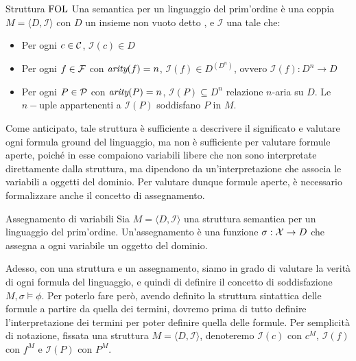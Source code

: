 \begin{definition}{Struttura \(\FOL\)}
  Una  semantica per un linguaggio del prim'ordine è una coppia \(M = \langle D, \mathcal{I} \rangle\) con \(D\) un insieme non vuoto detto , e \(\mathcal{I}\) una  tale che:
  \begin{itemize}
    \item Per ogni \(c\in\mathcal{C}\), \(\mathcal{I}(c)\in D\)
    \item Per ogni \(f\in\mathcal{F}\) con \(\operatorname{\textit{arity}}(f)=n\), \(\mathcal{I}(f) \in D^{(D^n)}\),  ovvero \(\mathcal{I}(f): D^n \to D\)
    \item Per ogni \(P\in\mathcal{P}\) con \(\operatorname{\textit{arity}}(P)=n\), \(\mathcal{I}(P)\subseteq D^n\) relazione \(n\)-aria su \(D\). Le \(n-\)uple appartenenti a \(\mathcal{I}(P)\) soddisfano \(P\) in \(M\).
  \end{itemize}
\end{definition}

Come anticipato, tale struttura è sufficiente a descrivere il significato e valutare ogni formula ground del linguaggio, ma non è sufficiente per valutare formule aperte, poiché in esse compaiono variabili libere che non sono interpretate direttamente dalla struttura, ma dipendono da un'interpretazione che associa le variabili a oggetti del dominio. Per valutare dunque formule aperte, è necessario formalizzare anche il concetto di assegnamento.

\begin{definition}{Assegnamento di variabili}
  Sia \(M = \langle D, \mathcal{I} \rangle\) una struttura semantica per un linguaggio del prim'ordine. Un'assegnamento è una funzione \(\sigma: \mathcal{X}\to D\) che assegna a ogni variabile un oggetto del dominio.
\end{definition}

Adesso, con una struttura e un assegnamento, siamo in grado di valutare la verità di ogni formula del linguaggio, e quindi di definire il concetto di soddisfazione \(M,\sigma\models \phi\). Per poterlo fare però, avendo definito la struttura sintattica delle formule a partire da quella dei termini, dovremo prima di tutto definire l'interpretazione dei termini per poter definire quella delle formule. Per semplicità di notazione, fissata una struttura \(M=\langle D,\mathcal{I}\rangle\), denoteremo \(\mathcal{I}(c)\) con \(c^M\), \(\mathcal{I}(f)\) con \(f^M\) e \(\mathcal{I}(P)\) con \(P^M\).

